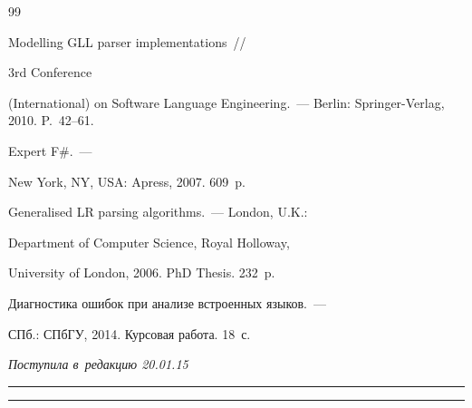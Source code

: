 {{\begin{thebibliography}{99}


   Modelling GLL parser implementations~/\!\!/


  3rd Conference


(International) on Software Language Engineering.~--- Berlin: Springer-Verlag, 2010. P.~42--61.




   Expert F\#.~---


  New York, NY, USA: Apress, 2007. 609~p.




   Generalised LR parsing algorithms.~--- London, U.K.:


  Department of Computer Science, Royal Holloway,


  University of London, 2006. PhD Thesis. 232~p.




   Диагностика ошибок при анализе встроенных языков.~---


  СПб.: СПбГУ, 2014.  Курсовая работа. 18~с.


\end{thebibliography}


} }








\vspace*{-3pt}





\hfill{\small\textit{Поступила в~редакцию 20.01.15}}








\vspace*{9pt}





\hrule





\vspace*{2pt}





\hrule













